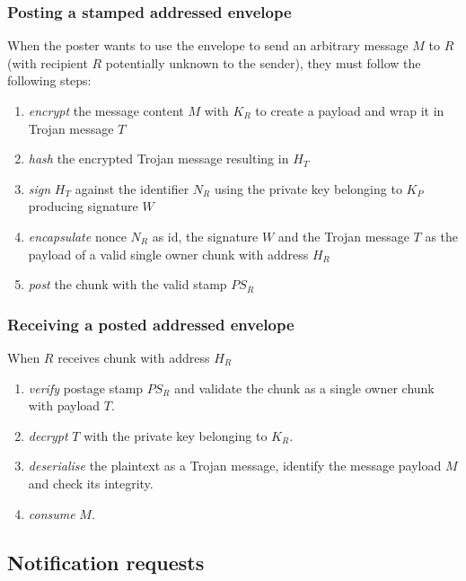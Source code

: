\subsubsection{Posting a stamped addressed envelope}

When the poster wants to use the envelope to send an arbitrary message $M$ to $R$ (with recipient $R$ potentially unknown to the sender), they must follow the following steps:

\begin{enumerate}
\item \emph{encrypt} the message content $M$ with $K_R$ to create a payload and wrap it in Trojan message $T$
\item \emph{hash} the encrypted Trojan message resulting in $H_T$
\item \emph{sign} $H_T$ against the identifier $N_R$ using the private key belonging to $K_P$ producing signature $W$
\item \emph{encapsulate} nonce $N_R$ as id, the signature $W$ and the Trojan message $T$ as the payload of a valid single owner chunk with address $H_R$
\item \emph{post} the chunk with the valid stamp $PS_R$
\end{enumerate}

\subsubsection{Receiving a posted addressed envelope}

When $R$ receives chunk with address $H_R$

\begin{enumerate}
\item \emph{verify} postage stamp $PS_R$ and validate the chunk as a single owner chunk with payload $T$.
\item \emph{decrypt} $T$ with the private key belonging to $K_R$.
\item \emph{deserialise} the plaintext as a Trojan message, identify the message payload $M$ and check its integrity.
\item \emph{consume} $M$.
\end{enumerate}

\subsection{Notification requests\statusgreen}\label{sec:notification-requests} 


